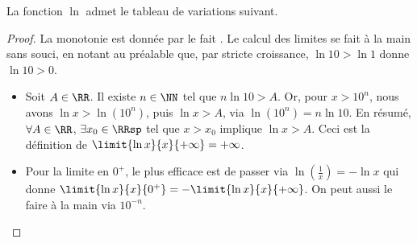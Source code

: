 \begin{fact} \label{ln-rab-var}
	La fonction $\ln$ admet le tableau de variations suivant.
	\begin{center}
	\end{center}
\end{fact}


\begin{proof}
	La monotonie est donnée par le fait .
	Le calcul des limites se fait à la main sans souci, en notant au préalable que, par stricte croissance, $\ln 10 > \ln 1$ donne $\ln 10 > 0$.
	\begin{itemize}
		\item Soit $A \in \RR$.
		Il existe $n \in \NN$ tel que $n \ln 10 > A$.
		Or, pour $x > 10^n$, nous avons $\ln x > \ln(10^n)$, puis $\ln x > A$, via $\ln(10^n) = n \ln 10$.
		En résumé,
		$\forall A \in \RR$, $\exists x_0 \in \RRsp$ tel que $x > x_0$ implique $\ln x > A$.
		Ceci est la définition de $\limit{\ln x}{x}{+ \infty} = +\infty$.
		
		\item Pour la limite en $0^+$, le plus efficace est de passer via $\ln(\frac1x) = - \ln x$ qui donne
		$\limit{\ln x}{x}{0^+} = - \limit{\ln x}{x}{+ \infty}$.
		On peut aussi le faire à la main via $10^{-n}$.
	\end{itemize}
	
	\null
	\vspace{-4ex}
\end{proof}
